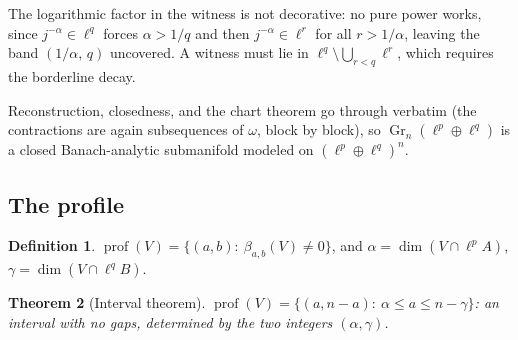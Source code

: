 \documentclass[11pt]{amsart}
\newtheorem{theorem}{Theorem}[section]
\theoremstyle{definition}
\newtheorem{definition}[theorem]{Definition}
\newcommand{\Gr}{\operatorname{Gr}}
\newcommand{\prof}{\operatorname{prof}}
\begin{document}
The logarithmic factor in the witness is not decorative: no pure power works, since $j^{-\alpha}\in\ell^q$ forces $\alpha>1/q$ and then $j^{-\alpha}\in\ell^r$ for all $r>1/\alpha$, leaving the band $(1/\alpha,\,q)$ uncovered. A witness must lie in $\ell^q\setminus\bigcup_{r<q}\ell^r$, which requires the borderline decay.

Reconstruction, closedness, and the chart theorem go through verbatim (the contractions are again subsequences of $\omega$, block by block), so $\Gr_n(\ell^p\oplus\ell^q)$ is a closed Banach-analytic submanifold modeled on $(\ell^p\oplus\ell^q)^n$.

\subsection{The profile}

\begin{definition}
$\prof(V)=\{(a,b):\ \beta_{a,b}(V)\ne0\}$, and
$\alpha=\dim(V\cap\ell^p A)$, $\gamma=\dim(V\cap\ell^q B)$.
\end{definition}

\begin{theorem}[Interval theorem]\label{thm:interval}
$\prof(V)=\{(a,n-a):\ \alpha\le a\le n-\gamma\}$: an interval with no gaps, determined by the two integers $(\alpha,\gamma)$.
\end{theorem}
\end{document}
